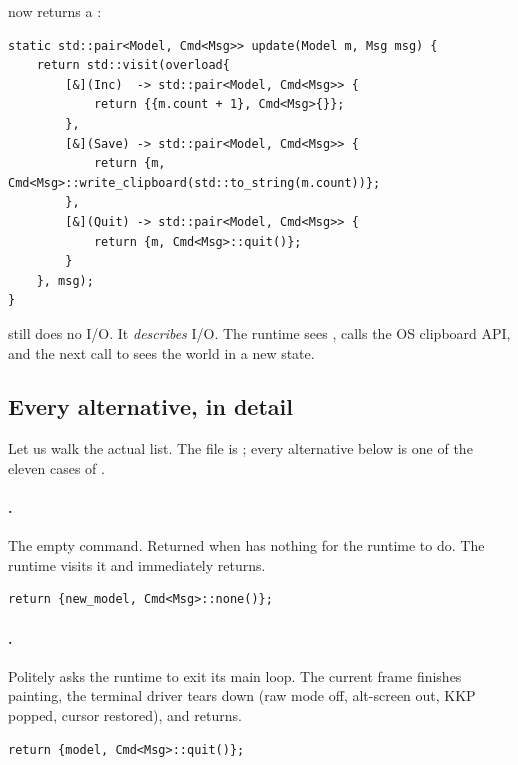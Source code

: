  now returns a :

\begin{lstlisting}
static std::pair<Model, Cmd<Msg>> update(Model m, Msg msg) {
    return std::visit(overload{
        [&](Inc)  -> std::pair<Model, Cmd<Msg>> {
            return {{m.count + 1}, Cmd<Msg>{}};
        },
        [&](Save) -> std::pair<Model, Cmd<Msg>> {
            return {m, Cmd<Msg>::write_clipboard(std::to_string(m.count))};
        },
        [&](Quit) -> std::pair<Model, Cmd<Msg>> {
            return {m, Cmd<Msg>::quit()};
        }
    }, msg);
}
\end{lstlisting}

 still does no I/O. It \emph{describes} I/O. The runtime
sees , calls the OS clipboard API, and the next
call to  sees the world in a new state.

\subsection{Every  alternative, in detail}
\label{sec:elm:cmd-tour}

Let us walk the actual list. The file is
; every alternative below is one
of the eleven cases of .

\paragraph{.} The empty command. Returned when
 has nothing for the runtime to do. The runtime visits
it and immediately returns.

\begin{lstlisting}
return {new_model, Cmd<Msg>::none()};
\end{lstlisting}

\paragraph{.} Politely asks the runtime to exit its main
loop. The current frame finishes painting, the terminal driver tears
down (raw mode off, alt-screen out, KKP popped, cursor restored),
and  returns.

\begin{lstlisting}
return {model, Cmd<Msg>::quit()};
\end{lstlisting}


